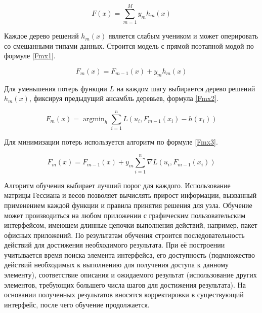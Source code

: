 \begin{equation}
  \label{Fx}
   F(x)=\sum_{m=1}^M y_m h_m(x)
\end{equation}

Каждое дерево решений $h_m(x)$ является слабым учеником и может оперировать со смешанными типами данных. Строится модель с прямой поэтапной модой по формуле \ref{Fmx1}.

\begin{equation}
  \label{Fmx1}
   F_m(x)=F_{m-1}(x)+y_m h_m(x)
\end{equation}

	Для уменьшения потерь функции $L$ на каждом шагу выбирается дерево решений $h_m(x)$, фиксируя предыдущий ансамбль деревьев, формула \ref{Fmx2}.

\begin{equation}
  \label{Fmx2}
   F_m(x)=\operatorname{argmin}_h \sum_{i=1}^n L\left(u_i, F_{m-1}\left(x_i\right)-h\left(x_i\right)\right)
\end{equation}

	Для минимизации потерь используется алгоритм по формуле \ref{Fmx3}.

\begin{equation}
  \label{Fmx3}
   F_m(x)=F_{m-1}(x)+y_m \sum_{i=1}^n \nabla L\left(u_i, F_{m-1}\left(x_i\right)\right)
\end{equation}

	Алгоритм обучения выбирает лучший порог для каждого. Использование матрицы Гессиана и весов позволяет вычислять прирост информации, вызванный применением каждой функции и правила принятия решения для узла.
	Обучение может производиться на любом приложении с графическим пользовательским интерфейсом, имеющем длинные цепочки выполнения действий, например, пакет офисных приложений. По результатам обучения строится последовательность действий для достижения необходимого результата. При её построении учитывается время поиска элемента интерфейса, его доступность (подмножество действий необходимых к выполнению для получения доступа к данному элементу), соответствие описания и ожидаемого результат (использование других элементов, требующих большего числа шагов для достижения результата). На основании полученных результатов вносятся корректировки в существующий интерфейс, после чего обучение продолжается.
\noteattributes{}

